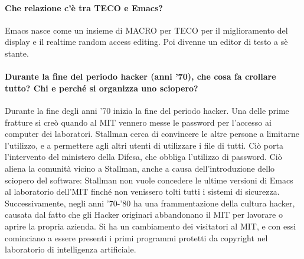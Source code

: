 \documentclass[a4paper]{article}
\begin{document}
		\paragraph{Che relazione c'è tra TECO e Emacs?}
		Emacs nasce come un insieme di MACRO per TECO per il miglioramento del display e il realtime random access editing. Poi divenne un editor di testo a sè stante.
		
		\paragraph{Durante la fine del periodo hacker (anni '70), che cosa fa crollare tutto? Chi e perché si organizza uno sciopero?}
		\label{par:hacker:fine}
		Durante la fine degli anni '70 inizia la fine del periodo hacker. Una delle prime fratture si creò quando al MIT vennero messe le password per l'accesso ai computer dei laboratori. Stallman cerca di convincere le altre persone a limitarne l’utilizzo, e a permettere agli altri utenti di utilizzare i file di tutti. Ciò porta l’intervento del ministero della Difesa, che obbliga l'utilizzo di password. Ciò aliena la comunità vicino a Stallman, anche a causa dell’introduzione dello sciopero del software: Stallman non vuole concedere le ultime versioni di Emacs al laboratorio dell'MIT finché non venissero tolti tutti i sistemi di sicurezza. \\
		Successivamente, negli anni '70-'80 ha una frammentazione della cultura hacker, causata dal fatto che gli Hacker originari abbandonano il MIT per lavorare o aprire la propria azienda. Si ha un cambiamento dei visitatori al MIT, e con essi cominciano a essere presenti i primi programmi protetti da copyright nel laboratorio di intelligenza artificiale. \\
\end{document}
